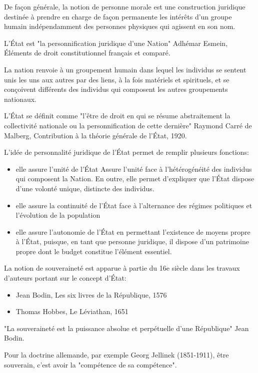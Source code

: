 \documentclass[12pt, a4paper, openany]{book}
\begin{document}
De façon générale, la notion de personne morale est une construction juridique  destinée à prendre en charge de façon permanente les intérêts d'un groupe humain indépendamment des personnes physiques qui agissent en son nom.

L'État est "la personnification juridique d'une Nation" Adhémar Esmein, Éléments de droit constitutionnel français et comparé.

La nation renvoie à un groupement humain dans lequel les individus se sentent unis les uns aux autres par des liens, à la fois matériels et spirituels, et se conçoivent différents des individus qui composent les autres groupements nationaux. 

L'État se définit comme "l'être de droit en qui se résume abstraitement la collectivité nationale ou la personnification de cette dernière" Raymond Carré de Malberg, Contribution à la théorie générale de l'État, 1920.

L'idée de personnalité juridique de l'État permet de remplir plusieurs fonctions:
\begin{itemize}
\item elle assure l'unité de l'État
Assure l'unité face à l'hétérogénéité des individus qui composent la Nation. En outre, elle permet d'expliquer que l'État dispose d'une volonté unique, distincte des individus.
\item elle assure la continuité de l'État face à l'alternance des régimes politiques et l'évolution de la population
\item elle assure l'autonomie de l'État en permettant l'existence de moyens propre à l'État, puisque, en tant que personne juridique, il dispose d'un patrimoine propre dont le budget constitue l'élément essentiel.
\end{itemize}


La notion de souveraineté est apparue à partie du 16e siècle dans les travaux d'auteurs portant sur le concept d'État:
\begin{itemize}
\item Jean Bodin, Les six livres de la République, 1576
\item Thomas Hobbes, Le Léviathan, 1651
\end{itemize}

"La souveraineté est la puissance absolue et perpétuelle d'une République" Jean Bodin.

Pour la doctrine allemande, par exemple Georg Jellinek (1851-1911), être souverain, c'est avoir la "compétence de sa compétence".
\end{document}
